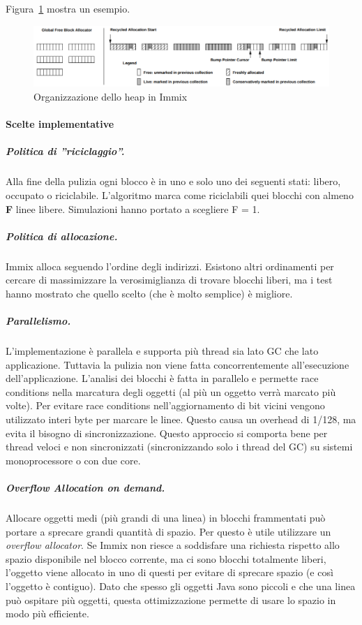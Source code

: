 Figura~\ref{fig:immixheap} mostra un esempio.
\begin{figure}[h]
	\centering
	\includegraphics[width=1.0\linewidth]{images/immixHeap}
	\caption[Organizzazione dello heap]{Organizzazione dello heap in Immix}
	\label{fig:immixheap}
\end{figure}

\paragraph{Scelte implementative} 
\subparagraph{Politica di ''riciclaggio''.} Alla fine della pulizia ogni blocco è in uno e solo uno dei seguenti stati: libero, occupato o riciclabile. L'algoritmo marca come riciclabili quei blocchi con almeno \textbf{F} linee libere. Simulazioni hanno portato a scegliere F = 1.
\subparagraph{Politica di allocazione.} Immix alloca seguendo l'ordine degli indirizzi. Esistono altri ordinamenti per cercare di massimizzare la verosimiglianza di trovare blocchi liberi, ma i test hanno mostrato che quello scelto (che è molto semplice) è migliore. 
\subparagraph{Parallelismo.} L'implementazione è parallela e supporta più thread sia lato GC che lato applicazione. Tuttavia la pulizia non viene fatta concorrentemente all'esecuzione dell'applicazione. L'analisi dei blocchi è fatta in parallelo e permette race conditions nella marcatura degli oggetti (al più un oggetto verrà marcato più volte). Per evitare race conditions nell'aggiornamento di bit vicini vengono utilizzato interi byte per marcare le linee. Questo causa un overhead di 1/128, ma evita il bisogno di sincronizzazione. Questo approccio si comporta bene per thread veloci e non sincronizzati (sincronizzando solo i thread del GC) su sistemi monoprocessore o con due core. 
\subparagraph{Overflow Allocation on demand.} Allocare oggetti medi (più grandi di una linea) in blocchi frammentati può portare a sprecare grandi quantità di spazio. Per questo è utile utilizzare un \textit{overflow allocator}. Se Immix non riesce a soddisfare una richiesta rispetto allo spazio disponibile nel blocco corrente, ma ci sono blocchi totalmente liberi, l'oggetto viene allocato in uno di questi per evitare di sprecare spazio (e così l'oggetto è contiguo). Dato che spesso gli oggetti Java sono piccoli e che una linea può ospitare più oggetti, questa ottimizzazione permette di usare lo spazio in modo più efficiente.

